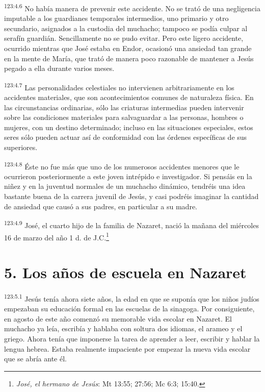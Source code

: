 \par 
\textsuperscript{123:4.6} No había manera de prevenir este accidente. No se trató de una negligencia imputable a los guardianes temporales intermedios, uno primario y otro secundario, asignados a la custodia del muchacho; tampoco se podía culpar al serafín guardián. Sencillamente no se pudo evitar. Pero este ligero accidente, ocurrido mientras que José estaba en Endor, ocasionó una ansiedad tan grande en la mente de María, que trató de manera poco razonable de mantener a Jesús pegado a ella durante varios meses.

\par 
\textsuperscript{123:4.7} Las personalidades celestiales no intervienen arbitrariamente en los accidentes materiales, que son acontecimientos comunes de naturaleza física. En las circunstancias ordinarias, sólo las criaturas intermedias pueden intervenir sobre las condiciones materiales para salvaguardar a las personas, hombres o mujeres, con un destino determinado; incluso en las situaciones especiales, estos seres sólo pueden actuar así de conformidad con las órdenes específicas de sus superiores.

\par 
\textsuperscript{123:4.8} Éste no fue más que uno de los numerosos accidentes menores que le ocurrieron posteriormente a este joven intrépido e investigador. Si pensáis en la niñez y en la juventud normales de un muchacho dinámico, tendréis una idea bastante buena de la carrera juvenil de Jesús, y casi podréis imaginar la cantidad de ansiedad que causó a sus padres, en particular a su madre.

\par 
\textsuperscript{123:4.9} José, el cuarto hijo de la familia de Nazaret, nació la mañana del miércoles 16 de marzo del año 1 d. de J.C.\footnote{\textit{José, el hermano de Jesús}: Mt 13:55; 27:56; Mc 6:3; 15:40.}

\section*{5. Los años de escuela en Nazaret}
\par 
\textsuperscript{123:5.1} Jesús tenía ahora siete años, la edad en que se suponía que los niños judíos empezaban su educación formal en las escuelas de la sinagoga. Por consiguiente, en agosto de este año comenzó su memorable vida escolar en Nazaret. El muchacho ya leía, escribía y hablaba con soltura dos idiomas, el arameo y el griego. Ahora tenía que imponerse la tarea de aprender a leer, escribir y hablar la lengua hebrea. Estaba realmente impaciente por empezar la nueva vida escolar que se abría ante él.

